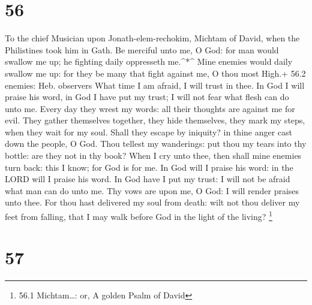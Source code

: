 \hypertarget{section-55}{%
\section{56}\label{section-55}}

To the chief Musician upon Jonath-elem-rechokim, Michtam of David, when
the Philistines took him in Gath.  Be merciful unto me, O
God: for man would swallow me up; he fighting daily oppresseth
me.\^{}*\^{}  Mine enemies would daily swallow me up: for
they be many that fight against me, O thou most High.+ 56.2 enemies:
Heb. observers  What time I am afraid, I will trust in thee.
 In God I will praise his word, in God I have put my trust;
I will not fear what flesh can do unto me.  Every day they
wrest my words: all their thoughts are against me for evil. 
They gather themselves together, they hide themselves, they mark my
steps, when they wait for my soul.  Shall they escape by
iniquity? in thine anger cast down the people, O God.  Thou
tellest my wanderings: put thou my tears into thy bottle: are they not
in thy book?  When I cry unto thee, then shall mine enemies
turn back: this I know; for God is for me.  In God will I
praise his word: in the LORD will I praise his word.  In
God have I put my trust: I will not be afraid what man can do unto me.
 Thy vows are upon me, O God: I will render praises unto
thee.  For thou hast delivered my soul from death: wilt not
thou deliver my feet from falling, that I may walk before God in the
light of the living? \footnote{56.1 Michtam\ldots: or, A golden Psalm of
  David}

\hypertarget{section-56}{%
\section{57}\label{section-56}}

